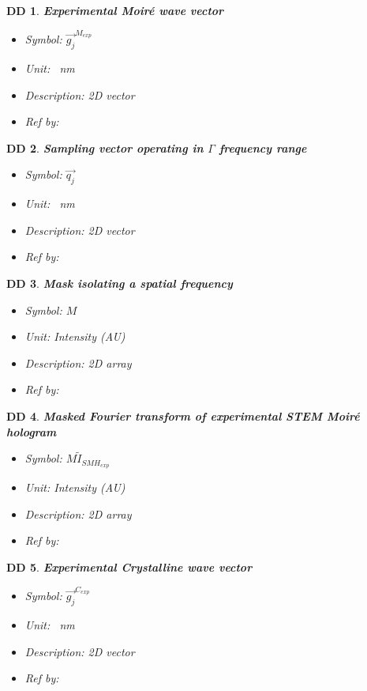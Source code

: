 \documentclass[12pt]{article}
\newtheorem{DD}{DD}
\begin{document}
\begin{DD}
\normalfont \textbf{Experimental Moir{\'e} wave vector}
\begin{itemize}
\item {Symbol}: $\overrightarrow{g_{j}}^{M_{exp}}$
\item {Unit}: \si{\per\nano\metre}
\item {Description}: 2D vector
\item {Ref by}:
\end{itemize}
\label{DD_7}
\end{DD}

\begin{DD}
\normalfont \textbf{Sampling vector operating in $\Gamma$ frequency range}
\begin{itemize}
\item {Symbol}: $\overrightarrow{q_{j}}$
\item {Unit}: \si{\per\nano\metre}
\item {Description}: 2D vector
\item {Ref by}:
\end{itemize}
\label{DD_8}
\end{DD}

\begin{DD}
\normalfont \textbf{Mask isolating a spatial frequency}
\begin{itemize}
\item {Symbol}: $M$
\item {Unit}: Intensity (AU)
\item {Description}: 2D array
\item {Ref by}:
\end{itemize}
\label{DD_9}
\end{DD}

\begin{DD}
\normalfont \textbf{Masked Fourier transform of experimental STEM Moir{\'e} hologram}
\begin{itemize}
\item {Symbol}: $M\widetilde{I}_{SMH_{exp}}$
\item {Unit}: Intensity (AU)
\item {Description}: 2D array
\item {Ref by}:
\end{itemize}
\label{DD_10}
\end{DD}

\begin{DD}
\normalfont \textbf{Experimental Crystalline wave vector}
\begin{itemize}
\item {Symbol}: $\overrightarrow{g_{j}}^{C_{exp}}$
\item {Unit}: \si{\per\nano\metre}
\item {Description}: 2D vector
\item {Ref by}:
\end{itemize}
\label{DD_11}
\end{DD}
\end{document}
